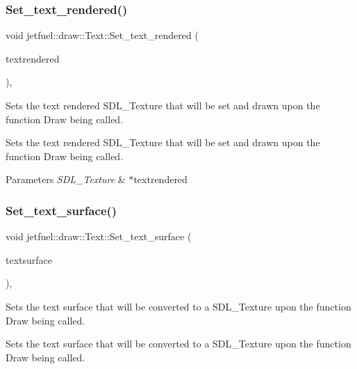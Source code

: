 \subsubsection{\texorpdfstring{Set\+\_\+text\+\_\+rendered()}{Set\_text\_rendered()}}
{\footnotesize\ttfamily void jetfuel\+::draw\+::\+Text\+::\+Set\+\_\+text\+\_\+rendered (\begin{DoxyParamCaption}\item[{S\+D\+L\+\_\+\+Texture $\ast$}]{textrendered }\end{DoxyParamCaption})\hspace{0.3cm}{\ttfamily [inline]}, {\ttfamily [protected]}}



Sets the text rendered S\+D\+L\+\_\+\+Texture that will be set and drawn upon the function Draw being called. 

Sets the text rendered S\+D\+L\+\_\+\+Texture that will be set and drawn upon the function Draw being called.


\begin{DoxyParams}{Parameters}
{\em S\+D\+L\+\_\+\+Texture} & $\ast$textrendered \\
\hline
\end{DoxyParams}
\mbox{\label{classjetfuel_1_1draw_1_1Text_a4d9c3cd635737cfde913f9b4015b181e}} 
\subsubsection{\texorpdfstring{Set\+\_\+text\+\_\+surface()}{Set\_text\_surface()}}
{\footnotesize\ttfamily void jetfuel\+::draw\+::\+Text\+::\+Set\+\_\+text\+\_\+surface (\begin{DoxyParamCaption}\item[{S\+D\+L\+\_\+\+Surface $\ast$}]{textsurface }\end{DoxyParamCaption})\hspace{0.3cm}{\ttfamily [inline]}, {\ttfamily [protected]}}



Sets the text surface that will be converted to a S\+D\+L\+\_\+\+Texture upon the function Draw being called. 

Sets the text surface that will be converted to a S\+D\+L\+\_\+\+Texture upon the function Draw being called.



